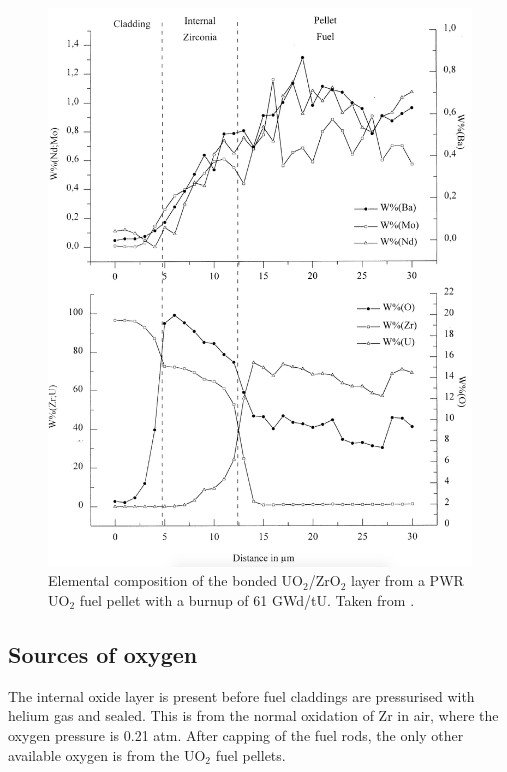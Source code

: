 \begin{figure}[ht!] %
\centering
\includegraphics[width=14cm]{images/bonding_layer_composition.png}
\caption[Elemental composition of the bonded UO$_{2}$/ZrO$_{2}$ layer from a PWR UO$_{2}$ fuel pellet with a burnup of 61 GWd/tU.]{Elemental composition of the bonded UO$_{2}$/ZrO$_{2}$ layer from a PWR UO$_{2}$ fuel pellet with a burnup of 61 GWd/tU. Taken from \cite{Lozano1998}.}
\label{figure:bonding_layer_composition}
\end{figure}


\subsection{Sources of oxygen}

The internal oxide layer is present before fuel claddings are pressurised with helium gas and sealed. This is from the normal oxidation of Zr in air, where the oxygen pressure is 0.21 atm. After capping of the fuel rods, the only other available oxygen is from the UO$_{2}$ fuel pellets.

